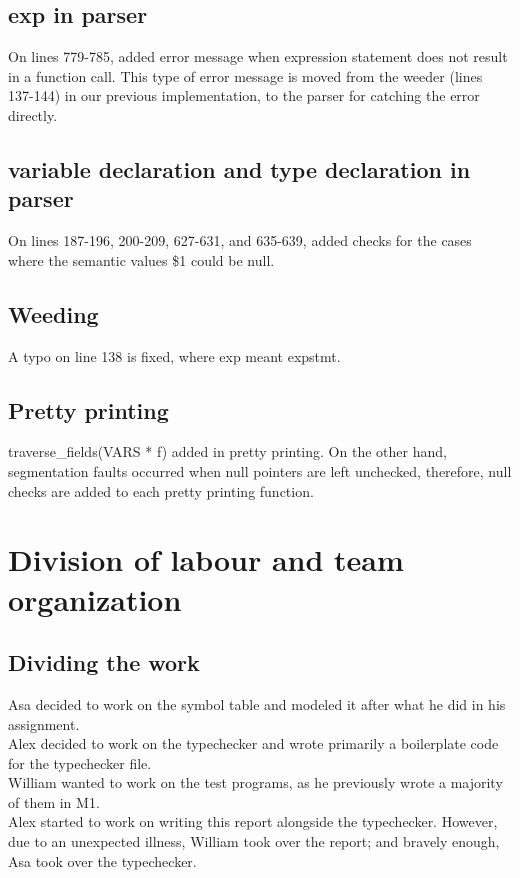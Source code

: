 \documentclass{article}
\begin{document}
\subsection{exp in parser}
On lines 779-785, added error message when expression statement does not result in a function call. This type of error message is moved from the weeder (lines 137-144) in our previous implementation, to the parser for catching the error directly.

\subsection{variable declaration and type declaration in parser}
On lines 187-196, 200-209, 627-631, and 635-639, added checks for the cases where the semantic values \$1 could be null.

\subsection{Weeding}
A typo on line 138 is fixed, where exp meant expstmt.

\subsection{Pretty printing}
traverse\_fields(VARS * f) added in pretty printing. On the other hand, segmentation faults occurred when null pointers are left unchecked, therefore, null checks are added to each pretty printing function.

\section{Division of labour and team organization}

\subsection{Dividing the work}


 Asa decided to work on the symbol table and modeled it after what he did in his assignment. \\
 Alex decided to work on the typechecker and wrote primarily a boilerplate code for the typechecker file. \\
 William wanted to work on the test programs, as he previously wrote a majority of them in M1. \\
 Alex started to work on writing this report alongside the typechecker. However, due to an unexpected illness, William took over the report; and bravely enough, Asa took over the typechecker.
\end{document}
